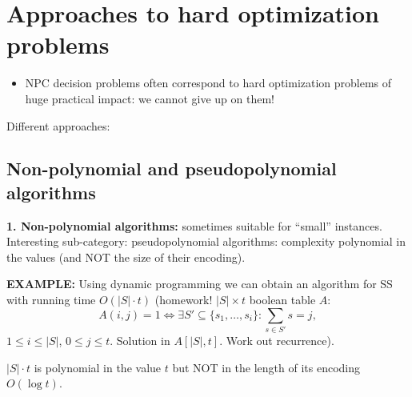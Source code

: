\section{Approaches to hard optimization problems}
\begin{itemize}
\item NPC decision problems often correspond to hard optimization problems of huge practical impact: we cannot give up on them!
\end{itemize}
Different approaches:

\subsection{Non-polynomial and pseudopolynomial algorithms}
\textbf{1. Non-polynomial algorithms:} sometimes suitable for ``small'' instances. Interesting sub-category: pseudopolynomial algorithms: complexity polynomial in the values (and NOT the size of their encoding).

\textbf{EXAMPLE:} Using dynamic programming we can obtain an algorithm for SS with running time $O(|S|\cdot t)$ (homework! $|S|\times t$ boolean table $A$:
\[A(i,j)=1\Longleftrightarrow\exists S'\subseteq\{s_1,\ldots,s_i\}:\sum_{s\in S'}s=j,\]
$1\leq i\leq|S|$, $0\leq j\leq t$. Solution in $A[|S|,t]$. Work out recurrence).

$|S|\cdot t$ is polynomial in the value $t$ but NOT in the length of its encoding $O(\log t)$.
